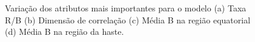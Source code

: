 \begin{figure}[H]
\centering
	\caption{Variação dos atributos mais importantes para o modelo (a) Taxa R/B (b) Dimensão de correlação (c) Média B na região equatorial (d) Média B na região da haste.}

\end{figure}
